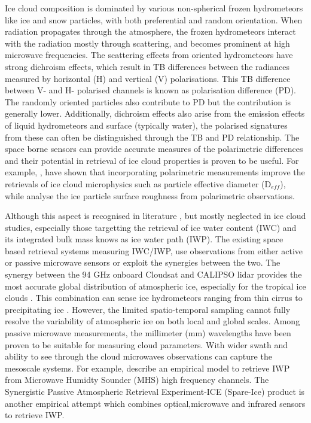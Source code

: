 \documentclass[amt, manuscript]{copernicus}
\begin{document}
Ice cloud composition is dominated by various non-spherical frozen hydrometeors like ice and snow particles, with both preferential and random orientation. When radiation propagates through the atmosphere, the frozen hydrometeors interact with the radiation mostly through scattering, and becomes prominent at high microwave frequencies. The scattering effects from oriented hydrometeors have strong dichroism effects, which result in TB differences between the radiances measured by horizontal (H) and vertical (V) polarisations. This TB difference between V- and H- polarised channels is known as polarisation difference (PD). The randomly oriented particles also contribute to PD but the contribution is generally lower. Additionally, dichroism effects also arise from the emission effects of liquid hydrometeors and surface (typically water), the polarised signatures from these can often be distinguished through the TB and PD relationship. The space borne sensors can provide accurate measures of the polarimetric differences and their potential in retrieval of ice cloud properties is proven to be useful. For example, \citep{coy:sensi:20}, have shown  that incorporating polarimetric measurements improve the retrievals of ice cloud microphysics such as particle effective diameter (D$_{eff}$), while \citet{hioki:degre:16} analyse the ice particle surface roughness from polarimetric observations.

Although this aspect is recognised in literature \citep{ xie:polar:11, gong:micro:17}, but mostly neglected in  ice cloud studies, especially those targetting the retrieval of ice water content (IWC) and its integrated bulk mass knows as ice water path (IWP). The existing space based retrieval systems measuring IWC/IWP, use observations from either active or passive microwave sensors or exploit the synergies between the two. The synergy between the 94\,\,GHz  onboard Cloudsat and CALIPSO lidar provides the most accurate global distribution of atmospheric ice, especially for the tropical ice clouds \citep{protat:theev:10}. This combination can sense ice hydrometeors ranging from thin cirrus to precipitating ice \citep{stephens:cloud:18}. However, the limited spatio-temporal sampling cannot fully resolve the  variability of atmospheric ice on both local and global scales. Among passive microwave measurements, the millimeter (mm) wavelengths have been proven to be suitable for measuring cloud parameters. With wider swath and ability to see through the cloud microwaves observations can capture the mesoscale systems. For example, \citet{gong:cloud:14} describe an empirical model to retrieve IWP from Microwave Humidty Sounder (MHS) high frequency channels. The Synergistic Passive Atmospheric Retrieval Experiment-ICE (Spare-Ice) product \citet{holl:spare:14} is another empirical attempt which combines optical,microwave and infrared sensors to retrieve IWP. 
\end{document}
